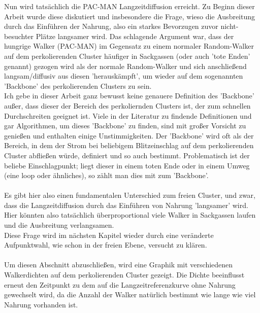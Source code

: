 \documentclass[a4paper, 12pt]{report}
\begin{document}
\noindent Nun wird tatsächlich die PAC-MAN Langzeitdiffusion erreicht. Zu Beginn dieser Arbeit wurde diese diskutiert und insbesondere die Frage, wieso die Ausbreitung durch das Einführen der Nahrung, also ein starkes Bevorzugen zuvor nicht-besuchter Plätze langsamer wird. Das schlagende Argument war, dass der hungrige Walker (PAC-MAN) im Gegensatz zu einem normaler Random-Walker auf dem perkolierenden Cluster häufiger in Sackgassen (oder auch 'tote Enden' genannt) gezogen wird als der normale Random-Walker und sich anschließend langsam/diffusiv aus diesen 'herauskämpft', um wieder auf dem sogenannten 'Backbone' des perkolierenden Clusters zu sein. 
\\
Ich gebe in dieser Arbeit ganz bewusst keine genauere Definition des 'Backbone' außer, dass dieser der Bereich des perkoliernden Clusters ist, der zum schnellen Durchschreiten geeignet ist. Viele in der Literatur zu findende Definitionen und gar Algorithmen, um dieses 'Backbone' zu finden, sind mit großer Vorsicht zu genießen und enthalten einige Unstimmigkeiten. Der 'Backbone' wird oft als der Bereich, in dem der Strom bei beliebigem Blitzeinschlag auf dem perkolierenden Cluster abfließen würde, definiert und so auch bestimmt. Problematisch ist der beliebe Einschlagpunkt; liegt dieser in einem toten Ende oder in einem Umweg (eine loop oder ähnliches), so zählt man dies mit zum 'Backbone'. 
\\
\\
Es gibt hier also einen fundamentalen Unterschied zum freien Cluster, und zwar, dass die Langzeitdiffusion durch das Einführen von Nahrung 'langsamer' wird. Hier könnten also tatsächlich überproportional viele Walker in Sackgassen laufen und die Ausbreitung verlangsamen. 
\\
Diese Frage wird im nächsten Kapitel wieder durch eine veränderte Aufpunktwahl, wie schon in der freien Ebene, versucht zu klären.
\\
\\
Um diesen Abschnitt abzuschließen, wird eine Graphik mit verschiedenen Walkerdichten auf dem perkolierenden Cluster gezeigt. Die Dichte beeinflusst erneut den Zeitpunkt zu dem auf die Langzeitreferenzkurve ohne Nahrung gewechselt wird, da die Anzahl der Walker natürlich bestimmt wie lange wie viel Nahrung vorhanden ist.
\end{document}
